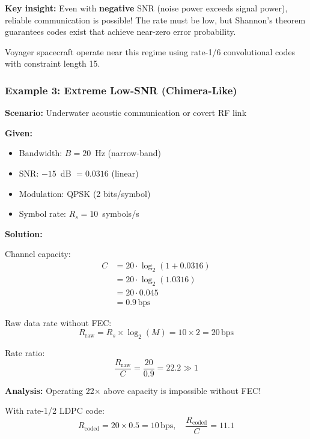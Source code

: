 \textbf{Key insight:} Even with \textbf{negative} SNR (noise power exceeds signal power), reliable communication is possible! The rate must be low, but Shannon's theorem guarantees codes exist that achieve near-zero error probability.

Voyager spacecraft operate near this regime using rate-1/6 convolutional codes with constraint length 15.

\subsubsection{Example 3: Extreme Low-SNR (Chimera-Like)}

\textbf{Scenario:} Underwater acoustic communication or covert RF link

\textbf{Given:}
\begin{itemize}
\item Bandwidth: $B = 20$~Hz (narrow-band)
\item SNR: $-15$~dB $= 0.0316$ (linear)
\item Modulation: QPSK (2 bits/symbol)
\item Symbol rate: $R_s = 10$~symbols/s
\end{itemize}

\textbf{Solution:}

Channel capacity:
\begin{align}
C &= 20 \cdot \log_2(1 + 0.0316) \nonumber \\
  &= 20 \cdot \log_2(1.0316) \nonumber \\
  &= 20 \cdot 0.045 \nonumber \\
  &= 0.9\,\text{bps}
\end{align}

Raw data rate without FEC:
\begin{equation}
R_{\text{raw}} = R_s \times \log_2(M) = 10 \times 2 = 20\,\text{bps}
\end{equation}

Rate ratio:
\begin{equation}
\frac{R_{\text{raw}}}{C} = \frac{20}{0.9} = 22.2 \gg 1
\end{equation}

\textbf{Analysis:} Operating 22$\times$ above capacity is impossible without FEC!

With rate-1/2 LDPC code:
\begin{equation}
R_{\text{coded}} = 20 \times 0.5 = 10\,\text{bps}, \quad \frac{R_{\text{coded}}}{C} = 11.1
\end{equation}

